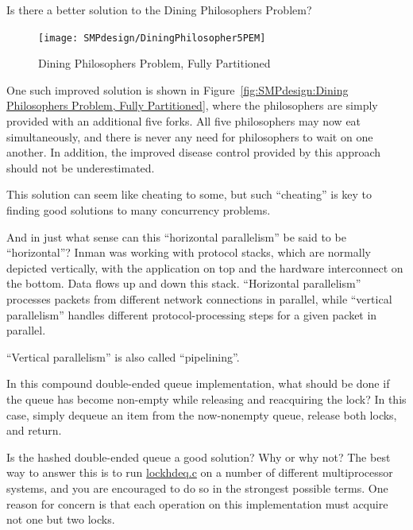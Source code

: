 \QuickQ{}
	Is there a better solution to the Dining
	Philosophers Problem?
\QuickA{}

\begin{figure}[tb]
\begin{center}
\texttt{[image: SMPdesign/DiningPhilosopher5PEM]}
\end{center}
\caption{Dining Philosophers Problem, Fully Partitioned}
\end{figure}

	One such improved solution is shown in
	Figure~\ref{fig:SMPdesign:Dining Philosophers Problem, Fully Partitioned},
	where the philosophers are simply provided with an additional
	five forks.
	All five philosophers may now eat simultaneously, and there
	is never any need for philosophers to wait on one another.
	In addition, the improved disease control provided by this
	approach should not be underestimated.

	This solution can seem like cheating to some, but such
	``cheating'' is key to finding good solutions to many
	concurrency problems.

\QuickQ{}
	And in just what sense can this ``horizontal parallelism'' be
	said to be ``horizontal''?
\QuickA{}
	Inman was working with protocol stacks, which are normally
	depicted vertically, with the application on top and the
	hardware interconnect on the bottom.
	Data flows up and down this stack.
	``Horizontal parallelism'' processes packets from different network
	connections in parallel, while ``vertical parallelism''
	handles different protocol-processing steps for a given
	packet in parallel.

	``Vertical parallelism'' is also called ``pipelining''.

\QuickQ{}
	In this compound double-ended queue implementation, what should
	be done if the queue has become non-empty while releasing
	and reacquiring the lock?
\QuickA{}
	In this case, simply dequeue an item from the now-nonempty
	queue, release both locks, and return.

\QuickQ{}
	Is the hashed double-ended queue a good solution?
	Why or why not?
\QuickA{}
	The best way to answer this is to run \url{lockhdeq.c} on
	a number of different multiprocessor systems, and you are
	encouraged to do so in the strongest possible terms.
	One reason for concern is that each operation on this
	implementation must acquire not one but two locks.

